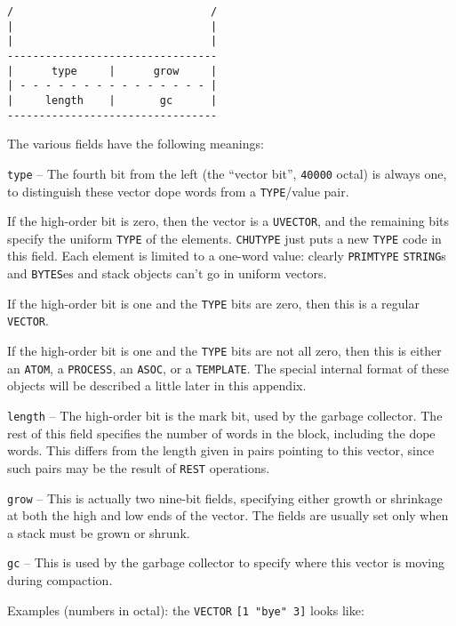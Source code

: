 \documentclass[a4paper,]{article}
\begin{document}
\begin{verbatim}
/                               /
|                               |
|                               |
---------------------------------
|      type     |      grow     |
| - - - - - - - - - - - - - - - |
|     length    |       gc      |
---------------------------------
\end{verbatim}

The various fields have the following meanings:

\texttt{type} -- The fourth bit from the left (the ``vector bit'', \texttt{40000} octal) is always one, to distinguish
these vector dope words from a \texttt{TYPE}/value pair.

If the high-order bit is zero, then the vector is a \texttt{UVECTOR}, and the remaining bits
specify the uniform \texttt{TYPE} of the elements. \texttt{CHUTYPE} just puts a new \texttt{TYPE}
code in this field. Each element is limited to a one-word value: clearly \texttt{PRIMTYPE} \texttt{STRING}s and
\texttt{BYTES}es and stack objects can't go in uniform vectors.

If the high-order bit is one and the \texttt{TYPE} bits are zero, then this is a regular
\texttt{VECTOR}.

If the high-order bit is one and the \texttt{TYPE} bits are not all zero, then this is either an \texttt{ATOM}, a
\texttt{PROCESS}, an \texttt{ASOC}, or a \texttt{TEMPLATE}. The special internal format of these
objects will be described a little later in this appendix.

\texttt{length} -- The high-order bit is the mark bit, used by the garbage collector. The rest of this field specifies the
number of words in the block, including the dope words. This differs from the length given in pairs pointing to this
vector, since such pairs may be the result of \texttt{REST} operations.

\texttt{grow} -- This is actually two nine-bit fields, specifying either growth or shrinkage at both the high and low ends
of the vector. The fields are usually set only when a stack must be grown or shrunk.

\texttt{gc} -- This is used by the garbage collector to specify where this vector is moving during compaction.

Examples (numbers in octal): the \texttt{VECTOR} \texttt{{[}1\ "bye"\ 3{]}} looks like:
\end{document}
